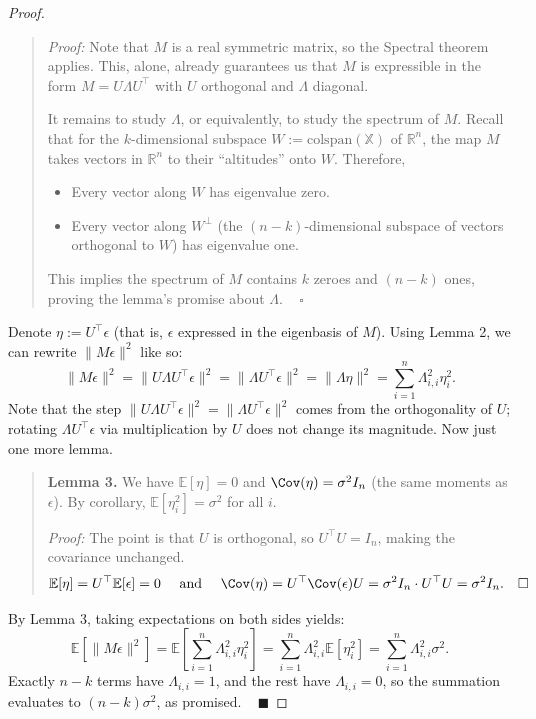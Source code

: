 \begin{proof}
\begin{quote}
        \emph{Proof:}
        Note that $M$ is a real symmetric matrix,
        so the Spectral theorem applies.
        This, alone, already guarantees us
        that $M$ is expressible in the form
        $M = U \Lambda U^{\top}$
        with $U$ orthogonal and $\Lambda$ diagonal.

        It remains to study $\Lambda$, or equivalently,
        to study the spectrum of $M$.
        Recall that for the $k$-dimensional subspace
        $W := \mathrm{colspan}(\mathbb{X})$ of $\mathbb{R}^n$,
        the map $M$ takes vectors in $\mathbb{R}^n$
        to their ``altitudes'' onto $W$.  Therefore,
        \begin{itemize}
            \item Every vector along $W$
            has eigenvalue zero.
            \item Every vector along $W^{\perp}$
            (the $(n - k)$-dimensional subspace of vectors orthogonal to $W$)
            has eigenvalue one.
        \end{itemize}
        This implies the spectrum of $M$ contains
        $k$ zeroes and $(n - k)$ ones,
        proving the lemma's promise about $\Lambda$.
        ~ $\square$
    \end{quote}

    Denote $\eta := U^{\top}\epsilon$ (that is,
    $\epsilon$ expressed in the eigenbasis of $M$).
    Using Lemma 2, we can rewrite $\|M\epsilon\|^2$ like so:
    \[
    \| M\epsilon \|^2
    = \| U\Lambda U^{\top} \epsilon \|^2
    = \| \Lambda U^{\top} \epsilon \|^2
    = \| \Lambda \eta \|^2
    = \sum_{i = 1}^n \Lambda_{i, i}^2 \eta_i^2.
    \]
    Note that the step
    $\|U\Lambda U^{\top}\epsilon\|^2 = \|\Lambda U^{\top}\epsilon\|^2$
    comes from the orthogonality of $U$;
    rotating $\Lambda U^{\top}\epsilon$ via multiplication by $U$
    does not change its magnitude.
    Now just one more lemma.

    \begin{quote}
        \textbf{Lemma 3.}
        We have $\mathbb{E}[\eta] = 0$ and $\Cov(\eta) = \sigma^2 I_n$
        (the same moments as $\epsilon$).
        By corollary, $\mathbb{E}[\eta_i^2] = \sigma^2$ for all $i$.

        \emph{Proof:}
        The point is that $U$ is orthogonal,
        so $U^{\top}U = I_n$, making the covariance unchanged.
        \[ \mathbb{E}[\eta] = U^{\top} \mathbb{E}[\epsilon] = 0
        ~~~ \text{ and } ~~~
        \Cov(\eta)
        = U^{\top}\Cov(\epsilon)U 
        = \sigma^2 I_n \cdot U^{\top}U
        = \sigma^2 I_n. ~~~ \square \]
    \end{quote}
    By Lemma 3, taking expectations on both sides yields:
    \[ \mathbb{E}\left[
        \|M\epsilon\|^2
    \right]
    = \mathbb{E}\left[
        \sum_{i = 1}^n \Lambda_{i, i}^2 \eta_i^2
    \right]
    = \sum_{i = 1}^n \Lambda_{i, i}^2 \mathbb{E}\left[\eta_i^2\right]
    = \sum_{i = 1}^n \Lambda_{i, i}^2 \sigma^2. \]
    Exactly $n - k$ terms have $\Lambda_{i, i} = 1$,
    and the rest have $\Lambda_{i, i} = 0$,
    so the summation evaluates to $(n - k) \sigma^2$,
    as promised. ~ $\blacksquare$
\end{proof}

